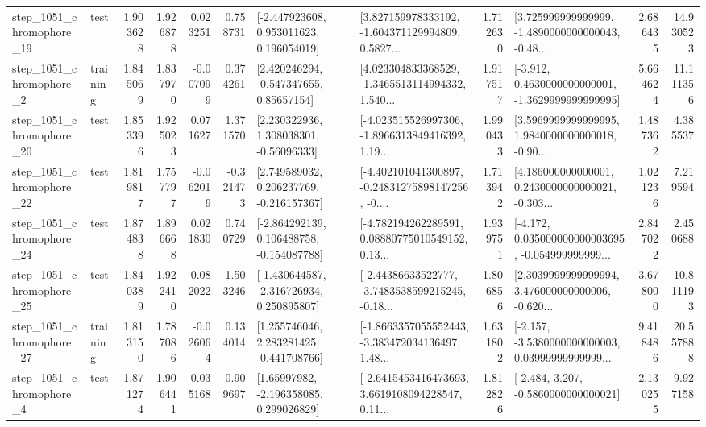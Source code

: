 \begin{tabular}{llrrrrllrlrr}
 step\_1051\_chromophore\_19 &      test &      1.903628 &    1.926878 &      0.023251 &  0.758731 &    [-2.447923608, 0.953011623, 0.196054019] &  [3.827159978333192, -1.604371129994809, 0.5827... &       1.712630 &  [3.725999999999999, -1.4890000000000043, -0.48... &            2.686435 &         14.930523 \\
  step\_1051\_chromophore\_2 &  training &      1.845069 &    1.837970 &     -0.007099 &  0.374261 &     [2.420246294, -0.547347655, 0.85657154] &  [4.023304833368529, -1.3465513114994332, 1.540... &       1.917517 &  [-3.912, 0.4630000000000001, -1.3629999999999995] &            5.664624 &         11.111356 \\
 step\_1051\_chromophore\_20 &      test &      1.853396 &    1.925023 &      0.071627 &  1.371570 &     [2.230322936, 1.308038301, -0.56096333] &  [-4.023515526997306, -1.8966313849416392, 1.19... &       1.990433 &  [3.5969999999999995, 1.9840000000000018, -0.90... &            1.487362 &          4.385537 \\
 step\_1051\_chromophore\_22 &      test &      1.819817 &    1.757797 &     -0.062019 & -0.321473 &    [2.749589032, 0.206237769, -0.216157367] &  [-4.402101041300897, -0.24831275898147256, -0.... &       1.713942 &  [4.186000000000001, 0.2430000000000021, -0.303... &            1.021236 &          7.219594 \\
 step\_1051\_chromophore\_24 &      test &      1.874838 &    1.896668 &      0.021830 &  0.740729 &   [-2.864292139, 0.106488758, -0.154087788] &  [-4.782194262289591, 0.08880775010549152, 0.13... &       1.939751 &  [-4.172, 0.035000000000003695, -0.054999999999... &            2.847022 &          2.450688 \\
 step\_1051\_chromophore\_25 &      test &      1.840389 &    1.922410 &      0.082022 &  1.503246 &   [-1.430644587, -2.316726934, 0.250895807] &  [-2.44386633522777, -3.7483538599215245, -0.18... &       1.806856 &  [2.3039999999999994, 3.476000000000006, -0.620... &            3.678000 &         10.811193 \\
 step\_1051\_chromophore\_27 &  training &      1.813150 &    1.787086 &     -0.026064 &  0.134014 &    [1.255746046, 2.283281425, -0.441708766] &  [-1.8663357055552443, -3.383472034136497, 1.48... &       1.631802 &  [-2.157, -3.5380000000000003, 0.03999999999999... &            9.418486 &         20.557888 \\
  step\_1051\_chromophore\_4 &      test &      1.871274 &    1.906441 &      0.035168 &  0.909697 &     [1.65997982, -2.196358085, 0.299026829] &  [-2.6415453416473693, 3.6619108094228547, 0.11... &       1.812826 &               [-2.484, 3.207, -0.5860000000000021] &            2.130255 &          9.927158 \\

\end{tabular}
